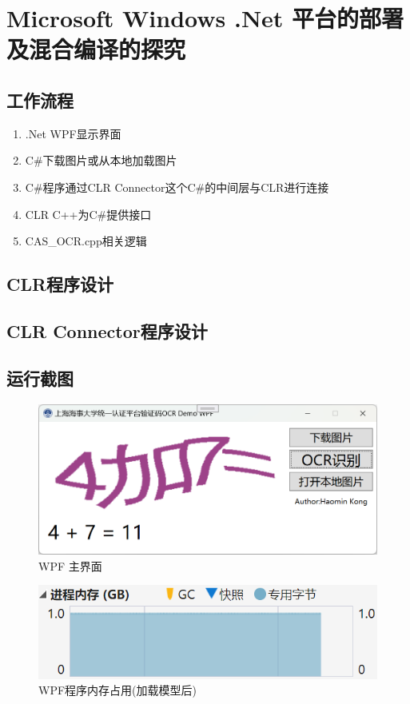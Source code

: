 \chapter{Microsoft Windows .Net 平台的部署及混合编译的探究}
\label{chapter:8dotnet}



\section{工作流程}

\begin{enumerate}
	\item .Net WPF显示界面
	\item C\#下载图片或从本地加载图片
	\item C\#程序通过CLR Connector这个C\#的中间层与CLR进行连接
	\item CLR C++为C\#提供接口
	\item CAS\_OCR.cpp相关逻辑
\end{enumerate}

\section{CLR程序设计}



\section{CLR Connector程序设计}

\section{运行截图}

\begin{figure}
	\centering
	\includegraphics[width=0.7\linewidth]{Resources/Picture/wpf_main}
	\caption{WPF 主界面}
	\label{fig:wpfmain}
\end{figure}

\begin{figure}
	\centering
	\includegraphics[width=0.7\linewidth]{Resources/Picture/wpf_memory}
	\caption{WPF程序内存占用(加载模型后)}
	\label{fig:wpfmemory}
\end{figure}

